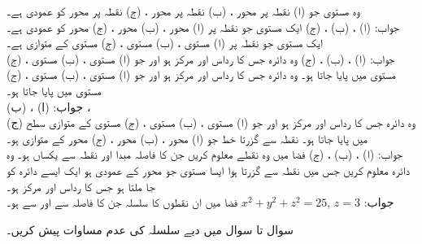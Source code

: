 وہ مستوی جو (ا) نقطہ  پر محور ، (ب) نقطہ  پر محور ، (ج) نقطہ  پر محور  کو عمودی ہے۔\\
جواب:\quad
(ا) ، (ب) ، (ج) 
ایک مستوی جو نقطہ  پر (ا) محور ، (ب) محور ، (ج) محور  کو عمودی ہے۔ 
ایک مستوی جو نقطہ  پر (ا) مستوی ، (ب) مستوی ، (ج) مستوی  کے متوازی ہے۔\\
جواب:\quad
(ا) ، (ب) ، (ج) 
وہ دائرہ جس کا رداس  اور مرکز  ہو اور جو (ا) مستوی ، (ب) مستوی ، (ج) مستوی  میں پایا جاتا ہو۔
وہ دائرہ جس کا رداس  اور مرکز  ہو اور جو (ا) مستوی ، (ب) مستوی ، (ج) مستوی  میں پایا جاتا ہو۔\\
جواب:\quad
(ا) ، (ب) ،\\
 (ج) 
وہ دائرہ جس کا رداس  اور مرکز  ہو اور جو (ا) مستوی ، (ب) مستوی ، (ج) مستوی  کے متوازی سطح میں پایا جاتا ہو۔
نقطہ  سے گزرتا خط جو (ا) محور ، (ب) محور ، (ج) محور  کے متوازی ہو۔\\
جواب:\quad
(ا) ، (ب) ، (ج) 
فضا میں وہ نقطے معلوم کریں جن کا فاصلہ مبدا اور نقطہ  سے یکساں ہو۔  
وہ دائرہ  معلوم کریں جس میں نقطہ  سے گزرتا ہوا ایسا مستوی جو محور  کے عمودی ہو ایک ایسے دائرہ کو جا ملتا ہو  جس کا رداس  اور مرکز  ہو۔\\
جواب:\quad
$x^2+y^2+z^2=25,\,z=3$
فضا میں ان نقطوں کا سلسلہ جن کا فاصلہ  سے   اور  سے  ہو۔  

سوال  تا سوال  میں دیے سلسلہ کی عدم مساوات پیش کریں۔

